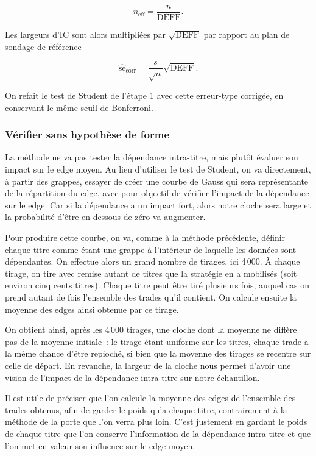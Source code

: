 \[
  n_{\mathrm{eff}} = \frac{n}{\mathrm{DEFF}} .
\]

Les largeurs d'IC sont alors multipliées par $\sqrt{\mathrm{DEFF}}$ par rapport au
plan de sondage de référence

\[
  \widehat{\mathrm{se}}_{\mathrm{corr}}
        = \frac{s}{\sqrt{n}}\sqrt{\mathrm{DEFF}} .
\]

On refait le test de Student de l'étape 1 avec cette erreur-type corrigée, en
conservant le même seuil de Bonferroni.

\subsubsection*{Vérifier sans hypothèse de forme}

La méthode ne va pas tester la dépendance intra-titre,
mais plutôt évaluer son impact sur le edge moyen.
Au lieu d'utiliser le test de Student, on va directement, à partir des
grappes, essayer de créer une courbe de Gauss qui sera représentante de la
répartition du edge, avec pour objectif de vérifier l'impact de la dépendance
sur le edge. Car si la dépendance a un impact fort, alors notre cloche sera
large et la probabilité d'être en dessous de zéro va augmenter.

Pour produire cette courbe, on va, comme à la méthode précédente, définir
chaque titre comme étant une grappe à l'intérieur de laquelle les données
sont dépendantes. On effectue alors un grand nombre de tirages, ici 4\,000.
À chaque tirage, on tire avec remise autant de titres que la stratégie en a
mobilisés (soit environ cinq cents titres). Chaque titre peut être tiré
plusieurs fois, auquel cas on prend autant de fois l'ensemble des trades
qu'il contient. On calcule ensuite la moyenne des edges ainsi obtenue par
ce tirage.

On obtient ainsi, après les 4\,000 tirages, une cloche dont la moyenne ne
diffère pas de la moyenne initiale~: le tirage étant uniforme sur les titres,
chaque trade a la même chance d'être repioché, si bien que la moyenne des
tirages se recentre sur celle de départ. En revanche, la largeur de la cloche
nous permet d'avoir une vision de l'impact de la dépendance intra-titre sur
notre échantillon.

Il est utile de préciser que l'on calcule la moyenne des edges de l'ensemble
des trades obtenus, afin de garder le poids qu'a chaque titre, contrairement
à la méthode de la porte que l'on verra plus loin. C'est justement en
gardant le poids de chaque titre que l'on conserve l'information de la
dépendance intra-titre et que l'on met en valeur son influence sur le edge
moyen.

